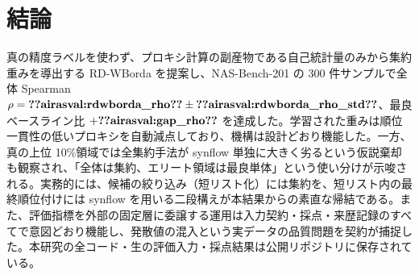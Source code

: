 \documentclass[11pt]{article}
\begin{document}
\section{結論}
真の精度ラベルを使わず、プロキシ計算の副産物である自己統計量のみから集約重みを導出する RD-WBorda を提案し、NAS-Bench-201 の 300 件サンプルで全体 Spearman $\rho = \airasval{rdwborda_rho} \pm \airasval{rdwborda_rho_std}$、最良ベースライン比 $+\airasval{gap_rho}$ を達成した。学習された重みは順位一貫性の低いプロキシを自動減点しており、機構は設計どおり機能した。一方、真の上位 10\%領域では全集約手法が synflow 単独に大きく劣るという仮説棄却も観察され、「全体は集約、エリート領域は最良単体」という使い分けが示唆される。実務的には、候補の絞り込み（短リスト化）には集約を、短リスト内の最終順位付けには synflow を用いる二段構えが本結果からの素直な帰結である。また、評価指標を外部の固定層に委譲する運用は入力契約・採点・来歴記録のすべてで意図どおり機能し、発散値の混入という実データの品質問題を契約が捕捉した。本研究の全コード・生の評価入力・採点結果は公開リポジトリに保存されている。



\end{document}
